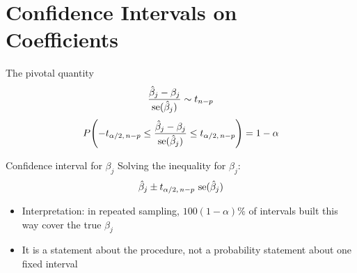 




\section{Confidence Intervals on Coefficients}


\begin{frame}{The pivotal quantity}
    \begin{align*}
        \frac{\hat\beta_j - \beta_j}{\operatorname{se}(\hat\beta_j)} \sim t_{n-p}
    \end{align*}
    \begin{align*}
        P\!\left(-t_{\alpha/2,\,n-p} \le \frac{\hat\beta_j - \beta_j}{\operatorname{se}(\hat\beta_j)} \le t_{\alpha/2,\,n-p}\right) = 1-\alpha
    \end{align*}
\end{frame}


\begin{frame}{Confidence interval for $\beta_j$}
    Solving the inequality for $\beta_j$:
    \begin{align*}
        \hat\beta_j \pm t_{\alpha/2,\,n-p}\, \operatorname{se}(\hat\beta_j)
    \end{align*}
    \begin{itemize}
        \item Interpretation: in repeated sampling, $100(1-\alpha)\%$ of intervals built this way cover the true $\beta_j$
        \item It is a statement about the procedure, not a probability statement about one fixed interval
    \end{itemize}
\end{frame}


